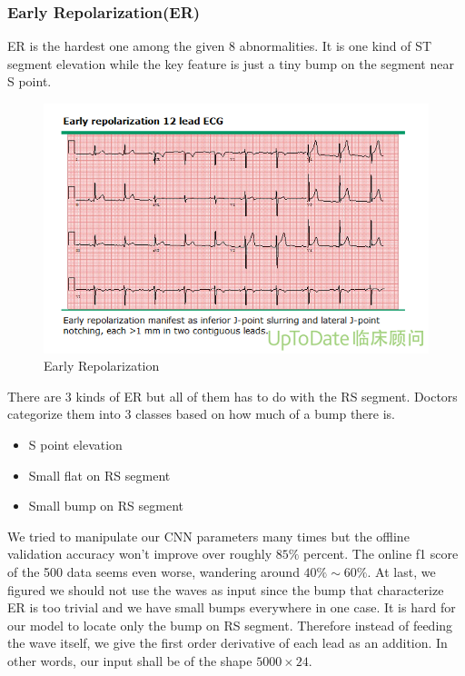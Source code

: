 \documentclass[%
 reprint,
 amsmath,amssymb,
 aps,
]{revtex4-2}
\begin{document}
\subsubsection{Early Repolarization(ER)}
ER is the hardest one among the given 8 abnormalities. It is one kind of ST segment elevation while the key feature is just a tiny bump on the segment near S point.
\begin{figure}[H]
	\includegraphics[width=\linewidth]{img/ER.png}
	\caption{\label{fig:ER} Early Repolarization \cite{UptoDate}}
\end{figure}
There are 3 kinds of ER but all of them has to do with the RS segment. Doctors categorize them into 3 classes based on how much of a bump there is. 
\begin{itemize}
	\item S point elevation
	\item Small flat on RS segment
	\item Small bump on RS segment
\end{itemize}
We tried to manipulate our CNN parameters many times but the offline validation accuracy won't improve over roughly $85\%$ percent. The online f1 score of the 500 data seems even worse, wandering around $40\% \sim 60\%$. 
At last, we figured we should not use the waves as input since the bump that characterize ER is too trivial and we have small bumps everywhere in one case. It is hard for our model to locate only the bump on RS segment. Therefore instead of feeding the wave itself, we give the first order derivative of each lead as an addition. In other words, our input shall be of the shape $5000 \times 24$. 
\end{document}
